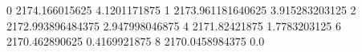 0 2174.166015625 4.1201171875
1 2173.961181640625 3.915283203125
2 2172.993896484375 2.947998046875
4 2171.82421875 1.7783203125
6 2170.462890625 0.4169921875
8 2170.0458984375 0.0
